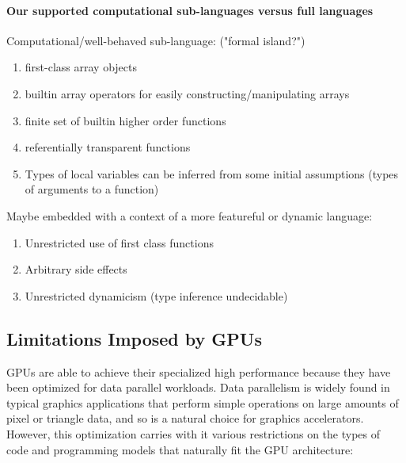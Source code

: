 \documentclass[preprint]{sigplanconf}
\begin{document}
\paragraph*{Our supported computational sub-languages versus full languages}
Computational/well-behaved sub-language: ("formal island?")
\begin{enumerate}
\item first-class array objects 
\item builtin array operators for easily constructing/manipulating arrays
\item finite set of builtin higher order functions
\item referentially transparent functions 
\item Types of local variables can be inferred from some initial assumptions (types of arguments to a function)
\end{enumerate} 

Maybe embedded with a context of a more featureful or dynamic language: 
\begin{enumerate}
\item Unrestricted use of first class functions
\item Arbitrary side effects
\item Unrestricted dynamicism (type inference undecidable)
\end{enumerate}


\subsection{Limitations Imposed by GPUs}
\label{GPULimitations}
GPUs are able to achieve their specialized high performance because they have
been optimized for data parallel workloads. 
Data parallelism is widely found in typical graphics applications
that perform simple operations on large amounts of pixel or triangle data, and
so is a natural choice for graphics accelerators.  However, this optimization
carries with it various restrictions on the types of code and programming models
that naturally fit the GPU architecture:
\end{document}
